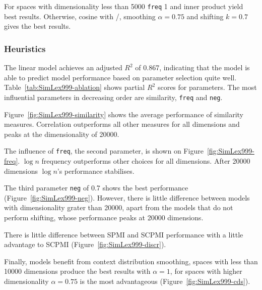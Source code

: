 For spaces with dimensionality less than 5000 \texttt{freq} 1 and inner product yield best results. Otherwise, cosine with \logNSCPMI/, smoothing $\alpha=0.75$ and shifting $k=0.7$ gives the best results.



\subsubsection{Heuristics}
\label{sec:heuristics-simlex}



% 

The linear model achieves an adjusted $R^2$ of 0.867, indicating that the model is able to predict model performance based on parameter selection quite well. Table~\ref{tab:SimLex999-ablation} shows partial $R^2$ scores for parameters. The most influential parameters in decreasing order are similarity, \texttt{freq} and \texttt{neg}.


Figure~\ref{fig:SimLex999-similarity} shows the average performance of similarity measures. Correlation outperforms all other measures for all dimensions and peaks at the dimensionality of 20000.


The influence of \texttt{freq}, the second parameter, is shown on Figure~\ref{fig:SimLex999-freq}. $\log n$ frequency outperforms other choices for all dimensions. After 20000 dimensions $\log n$'s performance stabilises.


The third parameter \texttt{neg} of 0.7 shows the best performance (Figure~\ref{fig:SimLex999-neg}). However, there is little difference between models with dimensionality grater than 20000, apart from the models that do not perform shifting, whose performance peaks at 20000 dimensions.


There is little difference between SPMI and SCPMI performance with a little advantage to SCPMI (Figure~\ref{fig:SimLex999-discr}).


Finally, models benefit from context distribution smoothing, spaces with less than 10000 dimensions produce the best results with $\alpha = 1$, for spaces with higher dimensionality $\alpha = 0.75$ is the most advantageous (Figure~\ref{fig:SimLex999-cds}).



